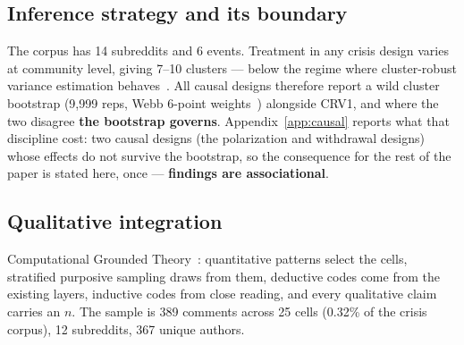 \subsection{Inference strategy and its boundary}

The corpus has 14 subreddits and 6 events. Treatment in any crisis design varies
at community level, giving 7--10 clusters --- below the regime where
cluster-robust variance estimation behaves~\cite{cameron2008bootstrap}. All
causal designs therefore report a wild cluster bootstrap (9{,}999 reps, Webb
6-point weights~\cite{mackinnon2017wildbootstrap}) alongside CRV1, and where the
two disagree \textbf{the bootstrap governs}. Appendix~\ref{app:causal} reports what
that discipline cost: two causal designs (the polarization and withdrawal
designs) whose effects do not survive the
bootstrap, so the consequence for the rest of the paper is stated here, once ---
\textbf{findings are associational}.

\subsection{Qualitative integration}
\label{sec:approach-qualitative}

Computational Grounded Theory~\cite{nelson2020cgt}: quantitative patterns select
the cells, stratified purposive sampling draws from them, deductive codes come
from the existing layers, inductive codes from close reading, and every
qualitative claim carries an $n$. The sample is 389 comments across 25 cells
(0.32\% of the crisis corpus), 12 subreddits, 367 unique authors.
